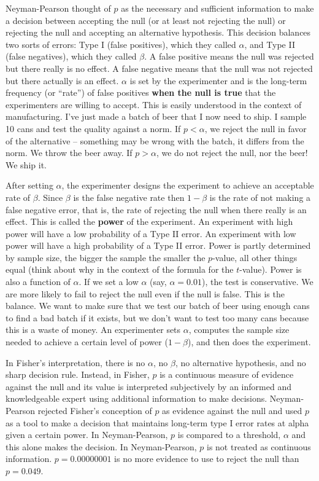 \documentclass[]{book}
\begin{document}
Neyman-Pearson thought of \(p\) as the necessary and sufficient
information to make a decision between accepting the null (or at least
not rejecting the null) or rejecting the null and accepting an
alternative hypothesis. This decision balances two sorts of errors: Type
I (false positives), which they called \(\alpha\), and Type II (false
negatives), which they called \(\beta\). A false positive means the null
was rejected but there really is no effect. A false negative means that
the null was not rejected but there actually is an effect. \(\alpha\) is
set by the experimenter and is the long-term frequency (or ``rate'') of
false positives \textbf{when the null is true} that the experimenters
are willing to accept. This is easily understood in the context of
manufacturing. I've just made a batch of beer that I now need to ship. I
sample 10 cans and test the quality against a norm. If \(p < \alpha\),
we reject the null in favor of the alternative -- something may be wrong
with the batch, it differs from the norm. We throw the beer away. If
\(p > \alpha\), we do not reject the null, nor the beer! We ship it.

After setting \(\alpha\), the experimenter designs the experiment to
achieve an acceptable rate of \(\beta\). Since \(\beta\) is the false
negative rate then \(1-\beta\) is the rate of not making a false
negative error, that is, the rate of rejecting the null when there
really is an effect. This is called the \textbf{power} of the
experiment. An experiment with high power will have a low probability of
a Type II error. An experiment with low power will have a high
probability of a Type II error. Power is partly determined by sample
size, the bigger the sample the smaller the \(p\)-value, all other
things equal (think about why in the context of the formula for the
\(t\)-value). Power is also a function of \(\alpha\). If we set a low
\(\alpha\) (say, \(\alpha=0.01\)), the test is conservative. We are more
likely to fail to reject the null even if the null is false. This is the
balance. We want to make sure that we test our batch of beer using
enough cans to find a bad batch if it exists, but we don't want to test
too many cans because this is a waste of money. An experimenter sets
\(\alpha\), computes the sample size needed to achieve a certain level
of power (\(1-\beta\)), and then does the experiment.

In Fisher's interpretation, there is no \(\alpha\), no \(\beta\), no
alternative hypothesis, and no sharp decision rule. Instead, in Fisher,
\(p\) is a continuous measure of evidence against the null and its value
is interpreted subjectively by an informed and knowledgeable expert
using additional information to make decisions. Neyman-Pearson rejected
Fisher's conception of \(p\) as evidence against the null and used \(p\)
as a tool to make a decision that maintains long-term type I error rates
at alpha given a certain power. In Neyman-Pearson, \(p\) is compared to
a threshold, \(\alpha\) and this alone makes the decision. In
Neyman-Pearson, \(p\) is not treated as continuous information.
\(p=0.00000001\) is no more evidence to use to reject the null than
\(p=0.049\).
\end{document}
